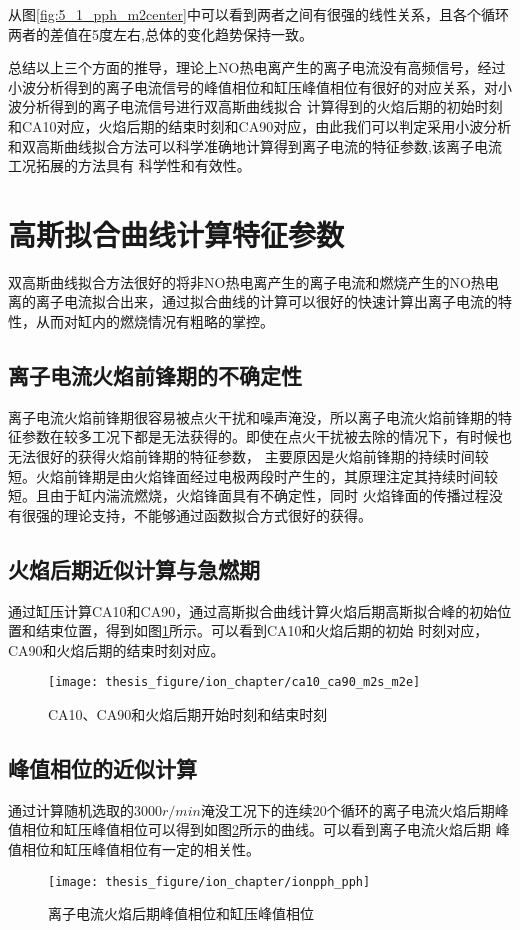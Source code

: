 从图\ref{fig:5_1_pph_m2center}中可以看到两者之间有很强的线性关系，且各个循环两者的差值在5度左右,总体的变化趋势保持一致。\par
总结以上三个方面的推导，理论上NO热电离产生的离子电流没有高频信号，经过小波分析得到的离子电流信号的峰值相位和缸压峰值相位有很好的对应关系，对小波分析得到的离子电流信号进行双高斯曲线拟合
计算得到的火焰后期的初始时刻和CA10对应，火焰后期的结束时刻和CA90对应，由此我们可以判定采用小波分析和双高斯曲线拟合方法可以科学准确地计算得到离子电流的特征参数,该离子电流工况拓展的方法具有
科学性和有效性。
\section{高斯拟合曲线计算特征参数}
双高斯曲线拟合方法很好的将非NO热电离产生的离子电流和燃烧产生的NO热电离的离子电流拟合出来，通过拟合曲线的计算可以很好的快速计算出离子电流的特性，从而对缸内的燃烧情况有粗略的掌控。
\subsection{离子电流火焰前锋期的不确定性}
离子电流火焰前锋期很容易被点火干扰和噪声淹没，所以离子电流火焰前锋期的特征参数在较多工况下都是无法获得的\cite{wxm2001,zxc2008}。即使在点火干扰被去除的情况下，有时候也无法很好的获得火焰前锋期的特征参数，
主要原因是火焰前锋期的持续时间较短。火焰前锋期是由火焰锋面经过电极两段时产生的，其原理注定其持续时间较短。且由于缸内湍流燃烧，火焰锋面具有不确定性，同时
火焰锋面的传播过程没有很强的理论支持，不能够通过函数拟合方式很好的获得。
\subsection{火焰后期近似计算与急燃期}
通过缸压计算CA10和CA90，通过高斯拟合曲线计算火焰后期高斯拟合峰的初始位置和结束位置，得到如图\ref{fig:ca10_ca90_m2s_m2e}所示。可以看到CA10和火焰后期的初始
时刻对应，CA90和火焰后期的结束时刻对应。
\begin{figure}[!htb]
	\centering
	\texttt{[image: thesis\_figure/ion\_chapter/ca10\_ca90\_m2s\_m2e]}
	\caption{\label{fig:ca10_ca90_m2s_m2e}CA10、CA90和火焰后期开始时刻和结束时刻}
\end{figure}
\subsection{峰值相位的近似计算}
通过计算随机选取的$3000r/min$淹没工况下的连续20个循环的离子电流火焰后期峰值相位和缸压峰值相位可以得到如图\ref{fig:ionpph_pph}所示的曲线。可以看到离子电流火焰后期
峰值相位和缸压峰值相位有一定的相关性。
\begin{figure}[htb]
	\centering
	\texttt{[image: thesis\_figure/ion\_chapter/ionpph\_pph]}
	\caption{\label{fig:ionpph_pph}离子电流火焰后期峰值相位和缸压峰值相位}
\end{figure}
